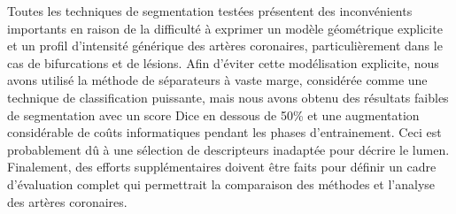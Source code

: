 \documentclass[a4paper, 11pt, oneside]{Thesis}  %
\begin{document}
{\clearpage

Toutes les techniques de segmentation test\'{e}es pr\'{e}sentent des inconv\'{e}nients importants en raison de la difficult\'{e} \`{a} exprimer un mod\`{e}le g\'{e}om\'{e}trique explicite et un profil d'intensit\'{e} g\'{e}n\'{e}rique des art\`{e}res coronaires, particuli\`{e}rement dans le cas de bifurcations et de l\'{e}sions. Afin d'\'{e}viter cette mod\'{e}lisation explicite, nous avons utilis\'{e} la m\'{e}thode de s\'{e}parateurs \`{a} vaste marge, consid\'{e}r\'{e}e comme une technique de classification puissante, mais nous avons obtenu des r\'{e}sultats faibles de segmentation avec un score Dice en dessous de 50\% et une augmentation consid\'{e}rable de co{\^u}ts informatiques pendant les phases d'entrainement. Ceci est probablement d{\^u} \`{a} une s\'{e}lection de descripteurs inadapt\'{e}e pour d\'{e}crire le lumen. Finalement, des efforts suppl\'{e}mentaires doivent \^{e}tre faits pour d\'{e}finir un cadre d'\'{e}valuation complet qui permettrait la comparaison des m\'{e}thodes et l'analyse des art\`{e}res coronaires.

}

\clearpage  %

\end{document}
